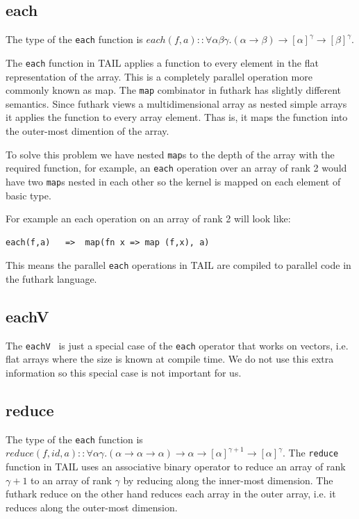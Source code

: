 \documentclass[11pt]{article}
\begin{document}
\subsection{each}

The type of the {\tt each} function is $each(f,a) :: \forall\alpha\beta\gamma.(\alpha \to \beta) \to [\alpha]^\gamma \to [\beta]^\gamma$.

The {\tt each} function in TAIL applies a function to every element in the flat representation of the array. This is a completely parallel operation more commonly known as map. The {\tt map} combinator in futhark has slightly different semantics.
Since futhark views a multidimensional array as nested simple arrays it applies the function to every array element.
Thas is, it maps the function into the outer-most dimention of the array.

To solve this problem we have nested {\tt map}s to the depth of the array with the required function, for example, an {\tt each} operation over an array of rank 2 would have two {\tt map}s nested in each other so the kernel is mapped on each element of basic type.

For example an each operation on an array of rank 2 will look like:
\begin{lstlisting}[numbers=none,frame=none]
each(f,a)	=>	map(fn x => map (f,x), a)
\end{lstlisting}

This means the parallel {\tt each} operations in TAIL are compiled to parallel code in the futhark language.

\subsection{eachV}
The {\tt eachV } is just a special case of the {\tt each} operator that works on vectors, i.e. flat arrays where the size
is known at compile time. We do not use this extra information so this special case is not important for us.

\subsection{reduce}
The type of the {\tt each} function is $reduce(f,id,a) :: \forall\alpha\gamma.(\alpha \to \alpha \to \alpha) \to \alpha \to [\alpha]^{\gamma+1} \to [\alpha]^\gamma$.
The {\tt reduce} function in TAIL uses an associative binary operator to reduce an array of rank $\gamma+1$ to an array of rank $\gamma$ by reducing along the inner-most dimension. The futhark reduce on the other hand reduces each array in the outer array, i.e. it reduces along the outer-most dimension. 
\end{document}
